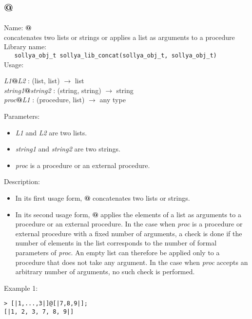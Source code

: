 \subsection{@}
\label{labconcat}
\noindent Name: \textbf{@}\\
\phantom{aaa}concatenates two lists or strings or applies a list as arguments to a procedure\\[0.2cm]
\noindent Library name:\\
\verb|   sollya_obj_t sollya_lib_concat(sollya_obj_t, sollya_obj_t)|\\[0.2cm]
\noindent Usage: 
\begin{center}
\emph{L1}\textbf{@}\emph{L2} : (\textsf{list}, \textsf{list}) $\rightarrow$ \textsf{list}\\
\emph{string1}\textbf{@}\emph{string2} : (\textsf{string}, \textsf{string}) $\rightarrow$ \textsf{string}\\
\emph{proc}\textbf{@}\emph{L1} : (\textsf{procedure}, \textsf{list}) $\rightarrow$ \textsf{any type}\\
\end{center}
Parameters: 
\begin{itemize}
\item \emph{L1} and \emph{L2} are two lists.
\item \emph{string1} and \emph{string2} are two strings.
\item \emph{proc} is a procedure or an external procedure.
\end{itemize}
\noindent Description: \begin{itemize}

\item In its first usage form, \textbf{@} concatenates two lists or strings.

\item In its second usage form, \textbf{@} applies the elements of a list as
   arguments to a procedure or an external procedure. In the case when \emph{proc} is
   a procedure or external procedure with a fixed number of arguments, a check
   is done if the number of elements in the list corresponds to the number of
   formal parameters of \emph{proc}. An empty list can therefore be applied only to a
   procedure that does not take any argument. In the case when \emph{proc} accepts an
   arbitrary number of arguments, no such check is performed.
\end{itemize}
\noindent Example 1: 
\begin{center}\begin{minipage}{15cm}\begin{Verbatim}[frame=single]
> [|1,...,3|]@[|7,8,9|];
[|1, 2, 3, 7, 8, 9|]
\end{Verbatim}
\end{minipage}\end{center}

